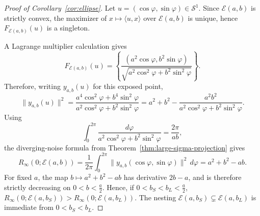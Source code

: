 \documentclass[11pt]{article}
\theoremstyle{plain}
\theoremstyle{definition}
\newcommand{\mcE}{\mathcal{E}}
\newcommand{\mcS}{\mathcal{S}}
\begin{document}
\begin{proof}[Proof of Corollary~\ref{cor:ellipse}]
Let $u=(\cos\varphi,\sin\varphi)\in\mcS^1$. Since $\mcE(a,b)$ is strictly convex, the maximizer of $x\mapsto \langle u,x\rangle$ over $\mcE(a,b)$ is unique, hence $F_{\mcE(a,b)}(u)$ is a singleton.

A Lagrange multiplier calculation gives
\[
    F_{\mcE(a,b)}(u)
    =
    \left\{
    \frac{
        (a^2\cos\varphi,b^2\sin\varphi)
    }{
        \sqrt{a^2\cos^2\varphi+b^2\sin^2\varphi}
    }
    \right\}.
\]
Therefore, writing $y_{a,b}(u)$ for this exposed point,
\[
    \|y_{a,b}(u)\|^2
    =
    \frac{
        a^4\cos^2\varphi+b^4\sin^2\varphi
    }{
        a^2\cos^2\varphi+b^2\sin^2\varphi
    }
    =
    a^2+b^2
    -
    \frac{a^2b^2}{
        a^2\cos^2\varphi+b^2\sin^2\varphi
    }.
\]
Using
\[
    \int_0^{2\pi}
    \frac{d\varphi}{
        a^2\cos^2\varphi+b^2\sin^2\varphi
    }
    =
    \frac{2\pi}{ab},
\]
the diverging-noise formula from Theorem~\ref{thm:large-sigma-projection} gives
\[
    R_\infty(0;\mcE(a,b))
    =
    \frac1{2\pi}
    \int_0^{2\pi}
        \|y_{a,b}(\cos\varphi,\sin\varphi)\|^2\,d\varphi =
    a^2+b^2-ab.
\]
For fixed $a$, the map $b\mapsto a^2+b^2-ab$ has derivative $2b-a$, and is therefore strictly decreasing on
$0<b<\frac{a}{2}$. Hence, if $0<b_S<b_L<\frac{a}{2}$, $R_\infty(0;\mcE(a,b_S))
    >
    R_\infty(0;\mcE(a,b_L))$.
The nesting $\mcE(a,b_S)\subsetneq \mcE(a,b_L)$ is immediate from $0<b_S<b_L$.
\end{proof}
\end{document}
